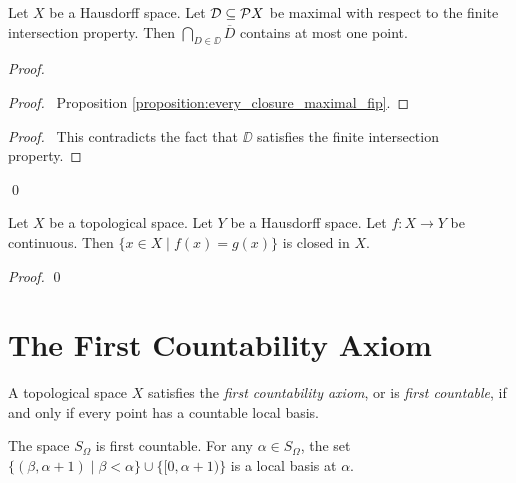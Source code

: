 \begin{proposition}
    Let $X$ be a Hausdorff space. Let $\mathcal{D} \subseteq \mathcal{P} X$ be maximal
    with respect to the finite intersection property. Then $\bigcap_{D \in \DD}
    \overline{D}$ contains at most one point.
\end{proposition}

\begin{proof}
    \pf
    \begin{proof}
        \pf\ Proposition \ref{proposition:every_closure_maximal_fip}.
    \end{proof}
    \qedstep
    \begin{proof}
        \pf\ This contradicts the fact that $\DD$ satisfies the finite intersection property.
    \end{proof}
    \qed
\end{proof}

\begin{proposition}
    Let $X$ be a topological space. Let $Y$ be a Hausdorff space. Let $f : X
    \rightarrow Y$ be continuous. Then $\{ x \in X \mid f(x) = g(x) \}$
    is closed in $X$.
\end{proposition}

\begin{proof}
    \pf
    \qed
\end{proof}

\section{The First Countability Axiom}

\begin{definition}
    A topological space $X$ satisfies the \emph{first countability axiom}, or is \emph{first countable}, if and only if every point has a countable local basis.
\end{definition}

\begin{example}
    The space $S_\Omega$ is first countable. For any $\alpha \in S_\Omega$,
    the set $\{ (\beta, \alpha + 1) \mid \beta < \alpha \} \cup \{ [0, \alpha + 1) \}$
    is a local basis at $\alpha$.
\end{example}

